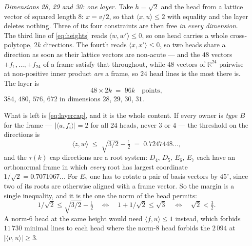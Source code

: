 \documentclass[11pt]{amsart}
\theoremstyle{remark}
\newcommand{\ip}[2]{\langle #1,#2\rangle}
\newcommand{\R}{\mathbb{R}}
\begin{document}
\emph{Dimensions 28, 29 and 30: one layer.} Take $h=\sqrt2$ and the head from
a lattice vector of squared length $8$: $x=v/2$, so that $\ip{x}{u}\le2$ with
equality and the layer deletes nothing. Three of its four constraints are then
free \emph{in every dimension}. The third line of \eqref{eq:heights} reads
$\ip{w}{w'}\le0$, so one head carries a whole cross-polytope, $2k$ directions.
The fourth reads $\ip{x}{x'}\le0$, so two heads share a direction as soon as
their lattice vectors are non-acute --- and the $48$ vectors
$\pm f_{1},\dots,\pm f_{24}$ of a frame satisfy that throughout, while $48$
vectors of $\R^{24}$ pairwise at non-positive inner product \emph{are} a frame,
so $24$ head lines is the most there is. The layer is
\begin{equation}\label{eq:framelayer}
  48\times2k \;=\; 96k \quad\text{points},
\end{equation}
$384$, $480$, $576$, $672$ in dimensions $28$, $29$, $30$, $31$.

What is left is \eqref{eq:layercap}, and it is the whole content. If
every owner is \emph{type $B$} for the frame --- $|\ip{u}{f_{i}}|=2$ for all
$24$ heads, never $3$ or $4$ --- the threshold on the directions is
\begin{equation}\label{eq:framethr}
  \ip{z}{w}\;\le\;\sqrt{3/2}-\tfrac12\;=\;0.7247448\ldots,
\end{equation}
and the $\tau(k)$ cap directions are a root system: $D_{4}$, $D_{5}$, $E_{6}$,
$E_{7}$ each have an orthonormal frame in which \emph{every} root has largest
coordinate $1/\sqrt2=0.7071067\ldots$ For $E_{7}$ one has to rotate a pair of
basis vectors by $45^{\circ}$, since two of its roots are otherwise aligned with
a frame vector. So the margin is a single inequality, and it is the one the
norm of the head permits:
\begin{equation}\label{eq:sqrt2}
  1/\sqrt2\le\sqrt{3/2}-\tfrac12
  \quad\Longleftrightarrow\quad 1+1/\sqrt2\le\sqrt3
  \quad\Longleftrightarrow\quad \sqrt2<\tfrac32 .
\end{equation}
A norm-$6$ head at the same height would need $\ip{f}{u}\le1$ instead, which
forbids $11\,730$ minimal lines to each head where the norm-$8$ head forbids the
$2\,094$ at $|\ip{v}{u}|\ge3$.
\end{document}
